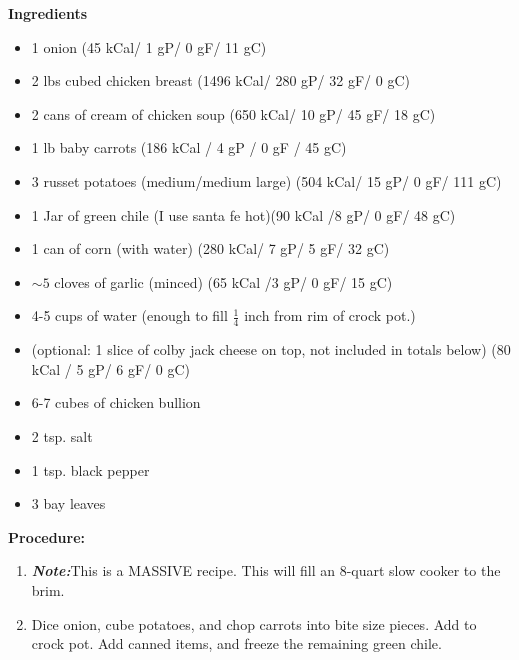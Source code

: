 \documentclass{report}
\begin{document}


\bigskip

\bigskip

\begin{multicols}{2}
\textbf{Ingredients}
\begin{itemize}
\item 1 onion \quad (45 kCal/ 1 gP/ 0 gF/ 11 gC)
\item 2 lbs cubed chicken breast \newline(1496 kCal/ 280 gP/  32 gF/ 0 gC)
\item 2 cans of cream of chicken soup  \quad (650 kCal/ 10 gP/ 45 gF/ 18 gC)
\item 1 lb baby carrots \quad (186 kCal / 4 gP / 0 gF / 45 gC)
\item 3 russet potatoes (medium/medium large) \quad (504 kCal/ 15 gP/ 0 gF/ 111 gC)
\item 1 Jar of green chile (I use santa fe hot)\newline  (90 kCal /8 gP/ 0 gF/ 48 gC)
\item 1 can of corn (with water) \quad (280 kCal/ 7 gP/ 5 gF/ 32 gC)
\item $\sim 5$ cloves of garlic (minced) (65 kCal /3 gP/ 0 gF/ 15 gC) 
\item 4-5 cups of water (enough to fill $\frac{1}{4}$ inch from rim of crock pot.)
\item (optional: 1 slice of colby jack cheese on top, not included in totals below) \newline (80 kCal / 5 gP/ 6 gF/ 0 gC)
\item 6-7 cubes of chicken bullion 
\item 2 tsp. salt
\item 1 tsp. black pepper
\item 3 bay leaves



\end{itemize}


\columnbreak
\textbf{Procedure:}
\medskip


\begin{enumerate}
\item \textbf{\textit{Note:}}This is a MASSIVE recipe. This will fill an 8-quart slow cooker to the brim. 
\item Dice onion, cube potatoes, and chop carrots into bite size pieces. Add to crock pot. Add canned items, and freeze the remaining green chile.  



\end{enumerate}
\end{multicols}
\end{document}
